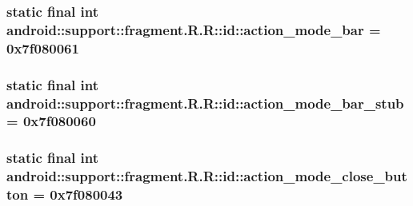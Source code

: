 \hypertarget{classandroid_1_1support_1_1fragment_1_1_r_1_1id_84fea7c596f2f7add231a9c77f7f444d}{
\subsubsection[{action\_\-mode\_\-bar}]{\setlength{\rightskip}{0pt plus 5cm}static final int android::support::fragment.R.R::id::action\_\-mode\_\-bar = 0x7f080061}}
\label{classandroid_1_1support_1_1fragment_1_1_r_1_1id_84fea7c596f2f7add231a9c77f7f444d}


\hypertarget{classandroid_1_1support_1_1fragment_1_1_r_1_1id_05830ba3a1a13f759d96f0d222bb958d}{
\subsubsection[{action\_\-mode\_\-bar\_\-stub}]{\setlength{\rightskip}{0pt plus 5cm}static final int android::support::fragment.R.R::id::action\_\-mode\_\-bar\_\-stub = 0x7f080060}}
\label{classandroid_1_1support_1_1fragment_1_1_r_1_1id_05830ba3a1a13f759d96f0d222bb958d}


\hypertarget{classandroid_1_1support_1_1fragment_1_1_r_1_1id_4132edcd0b760d5a316e5c92dcdcf299}{
\subsubsection[{action\_\-mode\_\-close\_\-button}]{\setlength{\rightskip}{0pt plus 5cm}static final int android::support::fragment.R.R::id::action\_\-mode\_\-close\_\-button = 0x7f080043}}
\label{classandroid_1_1support_1_1fragment_1_1_r_1_1id_4132edcd0b760d5a316e5c92dcdcf299}


